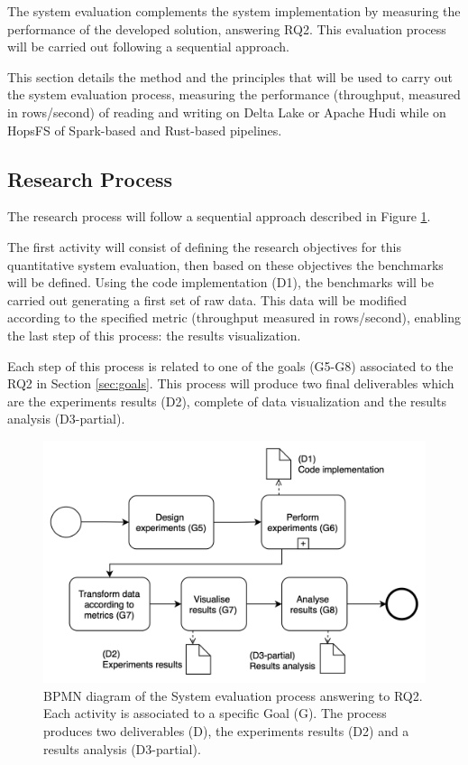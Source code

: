 The system evaluation complements the system implementation by measuring the performance of the developed solution, answering RQ2. This evaluation process will be carried out following a sequential approach.

This section details the method and the principles that will be used to carry out the system evaluation process, measuring the performance (throughput, measured in rows/second) of reading and writing on Delta Lake or Apache Hudi while on \gls{HopsFS} of Spark-based and Rust-based pipelines. 

\subsection{Research Process}
The research process will follow a sequential approach described in Figure \ref{fig:DevProcessRQ2}.

The first activity will consist of defining the research objectives for this quantitative system evaluation, then based on these objectives the benchmarks will be defined. Using the code implementation (D1), the benchmarks will be carried out generating a first set of raw data. This data will be modified according to the specified metric (throughput measured in rows/second), enabling the last step of this process: the results visualization. 

Each step of this process is related to one of the goals (G5-G8) associated to the RQ2 in Section \ref{sec:goals}. This process will produce two final deliverables which are the experiments results (D2), complete of data visualization and the results analysis (D3-partial).

\begin{figure}[!ht]
    \begin{center}
      \includegraphics[width=\textwidth]{figures/3-method/research_process_rq2.png}
    \caption{\gls{BPMN} diagram of the System evaluation process answering to RQ2. Each activity is associated to a specific Goal (\gls{G}). The process produces two deliverables (\gls{D}), the experiments results (D2) and a results analysis (D3-partial).}
    \label{fig:DevProcessRQ2}
    \end{center}
\end{figure}

